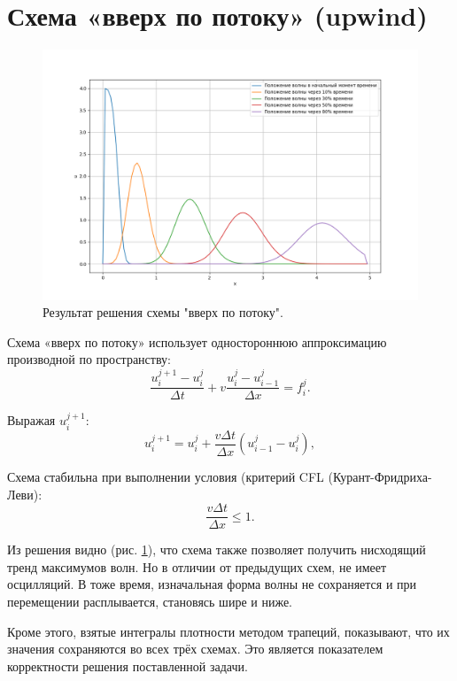 \section{Схема «вверх по потоку» (upwind)}
\begin{figure}[h]  %
	\centering
	\includegraphics[height=0.7\textwidth]{imgs/upwind.png}  %
	\caption{Результат решения  схемы "вверх по потоку".}  %
	\label{fig:upwind}  %
\end{figure}
Схема «вверх по потоку» использует одностороннюю аппроксимацию производной по пространству:
$$
	\frac{u_i^{j+1} - u_i^j}{\Delta t} + v \frac{u_i^j - u_{i-1}^j}{\Delta x} = f_{i}^j.
$$

Выражая $u_i^{j+1}$:
$$
	u_i^{j+1} = u_i^j + \frac{v \Delta t}{\Delta x} \left( u_{i-1}^j - u_i^j \right),
$$

Схема стабильна при выполнении условия (критерий CFL (Курант-Фридриха-Леви)\cite{Patankar1984}:
\begin{equation}
	\boxed{\frac{v \Delta t}{\Delta x} \leq 1}.
	\label{eq:ust2}
\end{equation}
\newline
 
Из решения видно (рис. \ref{fig:upwind}), что схема также позволяет получить нисходящий тренд максимумов волн.  Но в отличии от предыдущих схем, не имеет осцилляций. В тоже время, изначальная форма волны не сохраняется и при перемещении расплывается, становясь шире и ниже. 

Кроме этого, взятые интегралы плотности методом трапеций, показывают, что их значения сохраняются во всех трёх схемах. Это является показателем корректности решения поставленной задачи.








